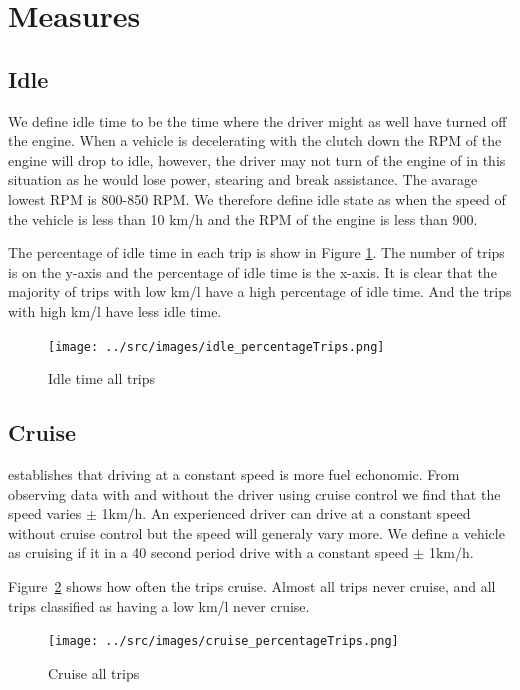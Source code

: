 

\section{Measures}

\subsection{Idle}
We define idle time to be the time where the driver might as well have turned off the engine. 
When a vehicle is decelerating with the clutch down the RPM of the engine will drop to idle, however, the driver may not turn of the engine of in this situation as he would lose power, stearing and break assistance. 
The avarage lowest RPM is 800-850 RPM. 
We therefore define idle state as when the speed of the vehicle is less than 10 km/h and the RPM of the engine is less than 900.

The percentage of idle time in each trip is show in Figure \ref{fig:kmlTrips}. 
The number of trips is on the y-axis and the percentage of idle time is the x-axis. 
It is clear that the majority of trips with low km/l have a high percentage of idle time. 
And the trips with high km/l have less idle time.

\begin{figure}[htb]
\centering
\texttt{[image: ../src/images/idle\_percentageTrips.png]}
\caption{Idle time all trips}
\label{fig:kmlTrips}
\end{figure}

\subsection{Cruise}

\cite{} establishes that driving at a constant speed is more fuel echonomic. 
From observing data with and without the driver using cruise control we find that the speed varies $\pm$ 1km/h. 
An experienced driver can drive at a constant speed without cruise control but the speed will generaly vary more. 
We define a vehicle as cruising if it in a 40 second period drive with a constant speed $\pm$ 1km/h.

Figure~\ref{fig:cruiseTrips} shows how often the trips cruise. 
Almost all trips never cruise, and all trips classified as having a low km/l never cruise.

\begin{figure}
\centering
\texttt{[image: ../src/images/cruise\_percentageTrips.png]}
\caption{Cruise all trips}
\label{fig:cruiseTrips}
\end{figure}

